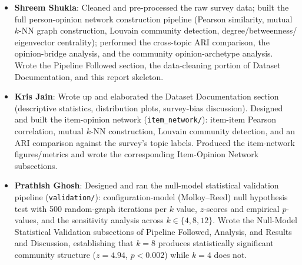 \documentclass[11pt]{article}
\begin{document}
\begin{itemize}
    \item \textbf{Shreem Shukla}: Cleaned and pre-processed the raw survey data;
    built the full person-opinion network construction pipeline (Pearson similarity,
    mutual $k$-NN graph construction, Louvain community detection, degree/betweenness/
    eigenvector centrality); performed the cross-topic ARI comparison, the
    opinion-bridge analysis, and the community opinion-archetype analysis. Wrote the
    Pipeline Followed section, the data-cleaning portion of Dataset Documentation, and
    this report skeleton.
    \item \textbf{Kris Jain}: Wrote up and elaborated the Dataset Documentation
    section (descriptive statistics, distribution plots, survey-bias discussion).
    Designed and built the item-opinion network (\texttt{item\_network/}): item-item
    Pearson correlation, mutual $k$-NN construction, Louvain community detection, and
    an ARI comparison against the survey's topic labels. Produced the item-network
    figures/metrics and wrote the corresponding Item-Opinion Network subsections.
    \item \textbf{Prathish Ghosh}: Designed and ran the null-model statistical
    validation pipeline (\texttt{validation/}): configuration-model (Molloy--Reed) null
    hypothesis test with 500 random-graph iterations per $k$ value, $z$-scores and
    empirical $p$-values, and the sensitivity analysis across $k \in \{4,8,12\}$. Wrote
    the Null-Model Statistical Validation subsections of Pipeline Followed, Analysis,
    and Results and Discussion, establishing that $k{=}8$ produces statistically
    significant community structure ($z=4.94$, $p<0.002$) while $k{=}4$ does not.
\end{itemize}
\end{document}
